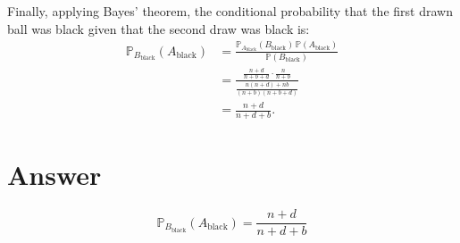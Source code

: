 \documentclass[12pt]{article}
\begin{document}
Finally, applying Bayes' theorem, the conditional probability that the first drawn ball was black given that the second draw was black is:
\[
\begin{aligned}
\mathbb{P}_{B_{\mathrm{black}}}(A_{\mathrm{black}}) 
&=\frac{\mathbb{P}_{A_{\mathrm{black}}}(B_{\mathrm{black}})\,\mathbb{P}(A_{\mathrm{black}})}{\mathbb{P}(B_{\mathrm{black}})}\\[1mm]
&=\frac{\frac{n+d}{n+b+d}\cdot\frac{n}{n+b}}{\frac{n(n+d)+nb}{(n+b)(n+b+d)}}\\[1mm]
&=\frac{n+d}{n+d+b}.
\end{aligned}
\]

\section*{Answer}
\[
\boxed{\mathbb{P}_{B_{\mathrm{black}}}(A_{\mathrm{black}}) = \frac{n+d}{n+d+b}}
\]
\end{document}
